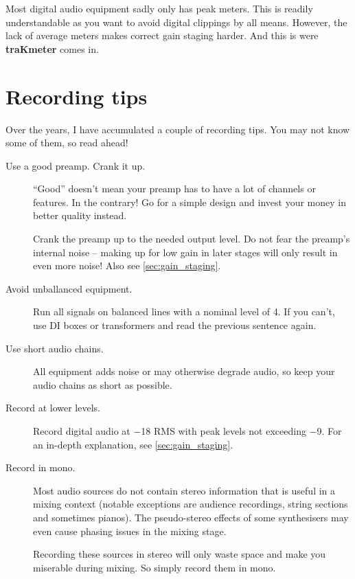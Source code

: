 Most digital audio equipment sadly only has peak meters.  This is
readily understandable as you want to avoid digital clippings by all
means.  However, the lack of average meters makes correct gain staging
harder.  And this is were \textbf{traKmeter} comes in.

\chapter{Recording tips}
\label{chap:recording_tips}

Over the years, I have accumulated a couple of recording tips.  You
may not know some of them, so read ahead!

\begin{description}

\item[Use a good preamp.  Crank it up.]  ``Good'' doesn't mean your
  preamp has to have a lot of channels or features.  In the contrary!
  Go for a simple design and invest your money in better quality
  instead.

  Crank the preamp up to the needed output level.  Do not fear the
  preamp's internal noise -- making up for low gain in later stages
  will only result in even more noise!  Also see
  \ref{sec:gain_staging}.

\item[Avoid unballanced equipment.]  Run all signals on balanced lines
  with a nominal level of \SI[addsign=all]{+4}{\dBu}.  If you can't,
  use DI boxes or transformers and read the previous sentence again.

\item[Use short audio chains.]  All equipment adds noise or may
  otherwise degrade audio, so keep your audio chains as short as
  possible.

\item[Record at lower levels.]  Record digital audio at
  \SI{-18}{\dBFS} RMS with peak levels not exceeding \SI{-9}{\dBFS}.
  For an in-depth explanation, see \ref{sec:gain_staging}.

\item[Record in mono.]  Most audio sources do not contain stereo
  information that is useful in a mixing context (notable exceptions
  are audience recordings, string sections and sometimes pianos).  The
  pseudo-stereo effects of some synthesisers may even cause phasing
  issues in the mixing stage.

  Recording these sources in stereo will only waste space and make you
  miserable during mixing.  So simply record them in mono.


\end{description}
